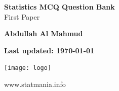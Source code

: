 \documentclass{exam}
\begin{document}
\begin{titlepage}
    \begin{center}
        \vspace*{1cm}
            
        \Huge
        \textbf{Statistics MCQ Question Bank} \\
        
       
            
        \vspace{0.5cm}
        \LARGE
        First Paper \\

            
        \vspace{1.5cm}
            
        \textbf{Abdullah Al Mahmud}
            
        \vfill
            
            \textbf{Last updated: \today}
        \vspace{0.8cm}
        
             \texttt{[image: logo]}
            
        \Large
        www.statmania.info\\
            
    \end{center}
\end{titlepage}

\tableofcontents

\newpage
\end{document}
